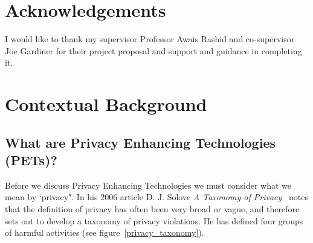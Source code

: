\documentclass[
    author={Jacob Daniel Halsey},
    supervisor={Prof. Awais Rashid},
    degree={BSc},
    title={Building a Testbed for Evaluating Privacy Enhancing Technologies  (PETs)},
    subtitle={},
    type={software development},
    year={2021}
]{dissertation}
\begin{document}
\chapter*{Acknowledgements}

I would like to thank my supervisor Professor Awais Rashid and co-supervisor Joe Gardiner for their
project proposal and support and guidance in completing it.

\mainmatter


\chapter{Contextual Background}
\label{chap:context}

\section{What are Privacy Enhancing Technologies (PETs)?}

Before we discuss Privacy Enhancing Technologies we must consider what we mean by `privacy". 
In his 2006 article D. J. Solove  \emph{A Taxonomy of Privacy}~\cite{solove_privacy} notes that the
definition of privacy has often been very broad or vague, and therefore sets out to develop
a taxonomy of privacy violations. He has defined four groups of harmful activities (see figure~\ref{privacy_taxonomy}). \\
\end{document}
